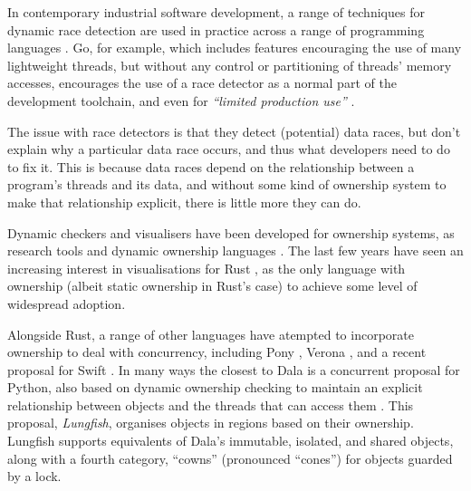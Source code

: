 In contemporary industrial software development, a range of techniques
for dynamic race detection are used in practice across a range of
programming languages
\cite{hong2015survey,o2003hybrid,cai2021sound,TSanRV2011,DBLP:conf/rv/EricksonFM12}.  Go, for
example, which includes features
encouraging the use of many lightweight threads, but without any control
or partitioning of threads' memory accesses,  encourages the use
of a race detector as a normal part of the development toolchain, and
even for \textit{``limited production use''}
\cite{GoCACM2022,TSanRV2011}.

The issue with race detectors is that they detect (potential)
data races, but don't explain why a particular data race
occurs, and thus what developers need to do to fix it.  This is
because data races depend on the relationship between a program's threads and
its data, and without some kind of ownership system to make that
relationship explicit, there is little more they can do.

Dynamic checkers and visualisers have been developed for ownership
systems, as research tools \cite{hill:2002:jvlc,MitchellECOOP2009} and
dynamic ownership languages \cite{dynamicOwn,dynamicAlias}. The last few
years have seen an 
increasing interest in visualisations for Rust \cite{RustBook}, as the only
language with ownership (albeit static ownership in Rust's case) to
achieve some level of widespread adoption.

Alongside Rust, a range of other languages have atempted to
incorporate ownership to deal with concurrency, including Pony
\cite{Pony}, Verona \cite{VeronaMemory2023,VeronaConcur2023}, and a
recent proposal for Swift \cite{gallifrey-pldi2022}. In many ways the
closest to Dala is a concurrent proposal for Python, also based on
dynamic ownership checking to maintain an explicit relationship
between objects and the threads that can access them
\cite{pyrona2025}. This proposal, \textit{Lungfish}, organises objects
in regions based on their ownership. Lungfish supports equivalents of
Dala's immutable, isolated, and shared objects, along with a fourth
category, ``cowns'' (pronounced ``cones'') for objects guarded by a
lock.


